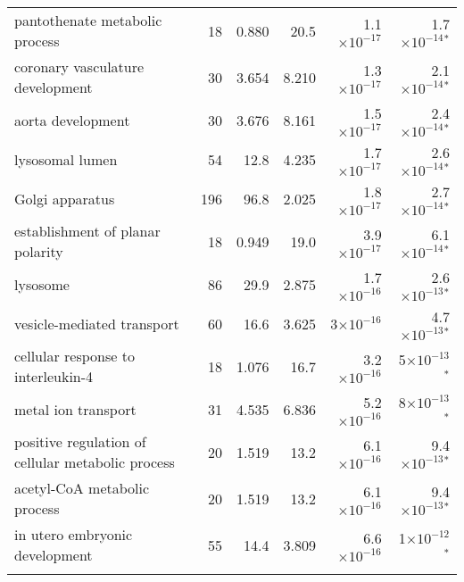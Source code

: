 \begin{longtable}{|l|r|r|r|r|r|}
                    pantothenate metabolic process &                      18 &                   0.880 &       20.5 & 1.1$\times 10^{-17}$ &  1.7$\times 10^{-14}$$\bm{^*}$ \\
                  coronary vasculature development &                      30 &                   3.654 &      8.210 & 1.3$\times 10^{-17}$ &  2.1$\times 10^{-14}$$\bm{^*}$ \\
                                 aorta development &                      30 &                   3.676 &      8.161 & 1.5$\times 10^{-17}$ &  2.4$\times 10^{-14}$$\bm{^*}$ \\
                                   lysosomal lumen &                      54 &                    12.8 &      4.235 & 1.7$\times 10^{-17}$ &  2.6$\times 10^{-14}$$\bm{^*}$ \\
                                   Golgi apparatus &                     196 &                    96.8 &      2.025 & 1.8$\times 10^{-17}$ &  2.7$\times 10^{-14}$$\bm{^*}$ \\
                  establishment of planar polarity &                      18 &                   0.949 &       19.0 & 3.9$\times 10^{-17}$ &  6.1$\times 10^{-14}$$\bm{^*}$ \\
                                          lysosome &                      86 &                    29.9 &      2.875 & 1.7$\times 10^{-16}$ &  2.6$\times 10^{-13}$$\bm{^*}$ \\
                        vesicle-mediated transport &                      60 &                    16.6 &      3.625 &   3$\times 10^{-16}$ &  4.7$\times 10^{-13}$$\bm{^*}$ \\
                cellular response to interleukin-4 &                      18 &                   1.076 &       16.7 & 3.2$\times 10^{-16}$ &    5$\times 10^{-13}$$\bm{^*}$ \\
                               metal ion transport &                      31 &                   4.535 &      6.836 & 5.2$\times 10^{-16}$ &    8$\times 10^{-13}$$\bm{^*}$ \\
 positive regulation of cellular metabolic process &                      20 &                   1.519 &       13.2 & 6.1$\times 10^{-16}$ &  9.4$\times 10^{-13}$$\bm{^*}$ \\
                      acetyl-CoA metabolic process &                      20 &                   1.519 &       13.2 & 6.1$\times 10^{-16}$ &  9.4$\times 10^{-13}$$\bm{^*}$ \\
                    in utero embryonic development &                      55 &                    14.4 &      3.809 & 6.6$\times 10^{-16}$ &    1$\times 10^{-12}$$\bm{^*}$ \\
$$
\end{longtable}
